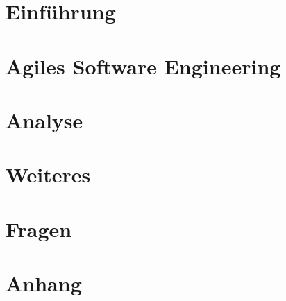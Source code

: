 
\usepackage{subfiles} %

\tableofcontents 
\chapter{Einführung}    \label{sec:einführung}
 
\chapter{Agiles Software Engineering}    \label{sec:ase} 


\chapter{Analyse} \label{sec:analyse}

\chapter{Weiteres}


\chapter{Fragen} \label{sec:fragen}
 
\chapter{Anhang}
\printglossary

